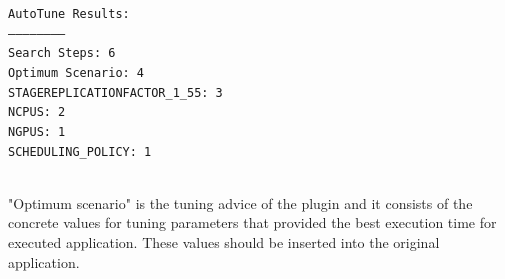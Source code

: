 \documentclass[11pt,a4paper, oneside]{book} %
\newenvironment{code}%
{
\addtolength{\leftskip}{0.5cm}}%
{

}
\begin{document}
\begin{code}
\texttt{AutoTune Results:\\
------------------------\\
Search Steps: 6 \\
Optimum Scenario: 4\\
\phantom{}\hspace{1em}STAGEREPLICATIONFACTOR\_1\_55: 3\\
\phantom{}\hspace{1em}NCPUS: 2\\
\phantom{}\hspace{1em}NGPUS: 1\\
\phantom{}\hspace{1em}SCHEDULING\_POLICY: 1\\
\\
}
\end{code}

"Optimum scenario" is the tuning advice of the plugin and it consists of the concrete values for tuning parameters that provided the best execution time for executed application. These values should be inserted into the original application.
\end{document}
